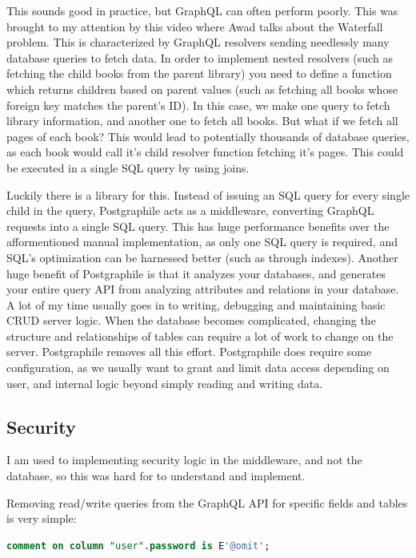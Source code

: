 \documentclass{l4proj}
\begin{document}
This sounds good in practice, but GraphQL can often perform poorly. This was brought to my attention by this video where Awad talks about the Waterfall problem. This is characterized by GraphQL resolvers sending needlessly many database queries to fetch data. In order to implement nested resolvers (such as fetching the child books from the parent library) you need to define a function which returns children based on parent values (such as fetching all books whose foreign key matches the parent's ID). In this case, we make one query to fetch library information, and another one to fetch all books. But what if we fetch all pages of each book? This would lead to potentially thousands of database queries, as each book would call it's child resolver function fetching it's pages. This could be executed in a single SQL query by using joins.

Luckily there is a library for this. Instead of issuing an SQL query for every single child in the query, Postgraphile acts as a middleware, converting GraphQL requests into a single SQL query. This has huge performance benefits over the afformentioned manual implementation, as only one SQL query is required, and SQL's optimization can be harnessed better (such as through indexes). Another huge benefit of Postgraphile is that it analyzes your databases, and generates your entire query API from analyzing attributes and relations in your database. A lot of my time usually goes in to writing, debugging and maintaining basic CRUD server logic. When the database becomes complicated, changing the structure and relationships of tables can require a lot of work to change on the server. Postgraphile removes all this effort. Postgraphile does require some configuration, as we usually want to grant and limit data access depending on user, and internal logic beyond simply reading and writing data.


\subsection{Security}
I am used to implementing security logic in the middleware, and not the database, so this was hard for to understand and implement. 

Removing read/write queries from the GraphQL API for specific fields and tables is very simple:

\begin{lstlisting}[language=SQL, caption={This comment tells Postgraphile to omit password fields} ]
comment on column "user".password is E'@omit';
\end{lstlisting}
\end{document}

